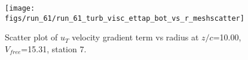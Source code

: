 \begin{figure}[H]
\centering
\texttt{[image: figs/run\_61/run\_61\_turb\_visc\_ettap\_bot\_vs\_r\_meshscatter]}
\caption{Scatter plot of $
u_T$ velocity gradient term vs radius at $z/c$=10.00, $V_{free}$=15.31, station 7.}
\end{figure}


